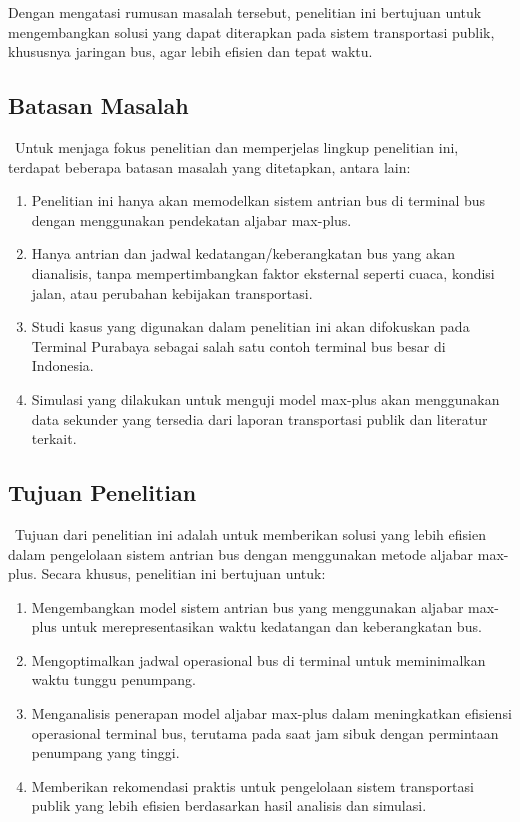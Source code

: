 \documentclass[12pt]{article}
\numberwithin{lemma}{subsection}
\begin{document}
Dengan mengatasi rumusan masalah tersebut, penelitian ini bertujuan untuk mengembangkan solusi yang dapat diterapkan pada sistem transportasi publik, khususnya jaringan bus, agar lebih efisien dan tepat waktu.

\subsection{Batasan Masalah}
$\,$\hskip 1cm Untuk menjaga fokus penelitian dan memperjelas lingkup penelitian ini, terdapat beberapa batasan masalah yang ditetapkan, antara lain:

\begin{enumerate}
    \item Penelitian ini hanya akan memodelkan sistem antrian bus di terminal bus dengan menggunakan pendekatan aljabar max-plus.
    \item Hanya antrian dan jadwal kedatangan/keberangkatan bus yang akan dianalisis, tanpa mempertimbangkan faktor eksternal seperti cuaca, kondisi jalan, atau perubahan kebijakan transportasi.
    \item Studi kasus yang digunakan dalam penelitian ini akan difokuskan pada Terminal Purabaya sebagai salah satu contoh terminal bus besar di Indonesia.
    \item Simulasi yang dilakukan untuk menguji model max-plus akan menggunakan data sekunder yang tersedia dari laporan transportasi publik dan literatur terkait.
\end{enumerate}

\subsection{Tujuan Penelitian}
$\,$\hskip 1cm Tujuan dari penelitian ini adalah untuk memberikan solusi yang lebih efisien dalam pengelolaan sistem antrian bus dengan menggunakan metode aljabar max-plus. Secara khusus, penelitian ini bertujuan untuk:

\begin{enumerate}
    \item Mengembangkan model sistem antrian bus yang menggunakan aljabar max-plus untuk merepresentasikan waktu kedatangan dan keberangkatan bus.
    \item Mengoptimalkan jadwal operasional bus di terminal untuk meminimalkan waktu tunggu penumpang.
    \item Menganalisis penerapan model aljabar max-plus dalam meningkatkan efisiensi operasional terminal bus, terutama pada saat jam sibuk dengan permintaan penumpang yang tinggi.
    \item Memberikan rekomendasi praktis untuk pengelolaan sistem transportasi publik yang lebih efisien berdasarkan hasil analisis dan simulasi.
\end{enumerate}
\end{document}
